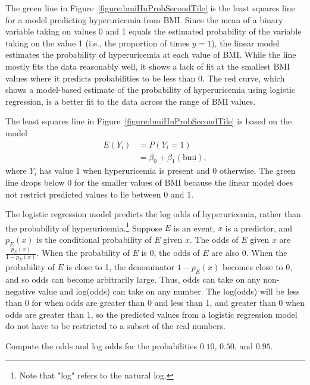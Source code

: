 The green line in Figure~\ref{figure:bmiHuProbSecondTile} is the least squares line for a model predicting hyperuricemia from BMI. Since the mean of a binary variable taking on values 0 and 1 equals the estimated probability of the variable taking on the value 1 (i.e., the proportion of times $y = 1$), the linear model estimates the probability of hyperuricemia at each value of BMI. While the line mostly fits the data reasonably well, it shows a lack of fit at the smallest BMI values where it predicts probabilities to be less than 0. The red curve, which shows a model-based estimate of the probability of hyperuricemia using logistic regression, is a better fit to the data across the range of BMI values.

The least squares line in Figure~\ref{figure:bmiHuProbSecondTile} is based on the model
\begin{align*}
  E(Y_i) &= P(Y_i = 1) \\
         &= \beta_0 + \beta_1 (\text{bmi}),
\end{align*}
where $Y_i$ has value 1 when hyperuricemia is present and 0 otherwise.  The green line drops below 0 for the smaller values of BMI because the linear model does not restrict predicted values to lie between 0 and 1.

The logistic regression model predicts the log odds of hyperuricemia, rather than the probability of hyperuricemia.\footnote{Note that "log" refers to the natural log.} Suppose $E$ is an event, $x$ is a predictor, and $p_{E}(x)$ is the conditional probability of $E$ given $x$. The odds of $E$ given $x$ are $\frac{p_{E}(x)}{1 - p_{E}(x)}$. When the probability of $E$ is 0, the odds of $E$ are also 0. When the probability of $E$ is close to 1, the denominator $1 - p_{E}(x)$ becomes close to 0, and so odds can become arbitrarily large. Thus, odds can take on any non-negative value and log(odds) can take on any number. The log(odds) will be less than 0 for when odds are greater than 0 and less than 1, and greater than 0 when odds are greater than 1, so the predicted values from a logistic regression model do not have to be restricted to a subset of the real numbers.

\begin{exercisewrap}
\begin{nexercise}
  Compute the odds and log odds for the probabilities $0.10$, $0.50$, and $0.95$.\footnotemark{}
\end{nexercise}
\end{exercisewrap}

